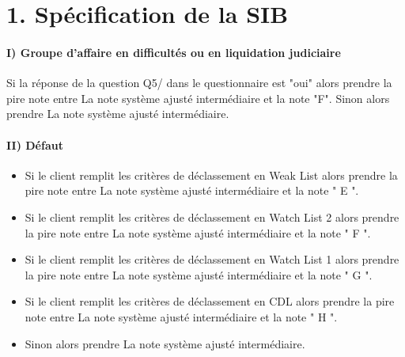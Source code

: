 \section*{1. Spécification de la SIB}


\paragraph{I)	Groupe d’affaire en difficultés ou en liquidation judiciaire\\ }
Si la réponse de la question Q5/ dans le questionnaire est "oui" alors prendre la pire note entre La note système ajusté intermédiaire et la note "F".
Sinon alors prendre La note système ajusté intermédiaire.\\


\paragraph{II)		Défaut\\}

\begin{itemize}
    \item Si le client remplit les critères de déclassement en Weak List alors prendre la pire note entre La note système ajusté intermédiaire et la note " E ".
    \item Si le client remplit les critères de déclassement en Watch List 2 alors prendre la pire note entre La note système ajusté intermédiaire et la note " F ".
    \item Si le client remplit les critères de déclassement en Watch List 1 alors prendre la pire note entre La note système ajusté intermédiaire et la note " G ".
    \item Si le client remplit les critères de déclassement en CDL alors prendre la pire note entre La note système ajusté intermédiaire et la note " H ".
    \item Sinon alors prendre La note système ajusté intermédiaire.
\end{itemize}

